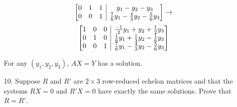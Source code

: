 \documentclass{article}
\makeatletter
\newenvironment{abmatrix}[1]
{
    \left[
        \begin{array} {@{}*{#1}{c}|c@{}}
}
{ 
        \end{array}
    \right]
}
\makeatother
\begin{document}
\begin{enumerate}[listparindent=\parindent]
\[\begin{abmatrix}{3}
        0 & 1 & 1 & y_1 - y_2 - y_3 \\
        0 & 0 & 1 & \frac{7}{6}y_1 - \frac{4}{3}y_2 - \frac{5}{6}y_3
    \end{abmatrix}
    \rightarrow
\]
\[
    \begin{abmatrix}{3}
        1 & 0 & 0 & \frac{-1}{2}y_1 + y_2 + \frac{1}{2}y_3 \\
        0 & 1 & 0 & \frac{1}{6}y_1 + \frac{1}{3}y_2 - \frac{1}{6}y_3 \\
        0 & 0 & 1 & \frac{7}{6}y_1 - \frac{4}{3}y_2 - \frac{5}{6}y_3
    \end{abmatrix}
\]

For any \((y_1, y_2, y_3)\), \(AX = Y\) has a solution.

\item[10.] Suppose \(R\) and \(R'\) are \(2 \times 3\) row-reduced echelon matrices and that the
    systems \(RX = 0\) and \(R'X = 0\) have exactly the same solutions. Prove that \(R = R'\).

\end{enumerate}
\end{document}
